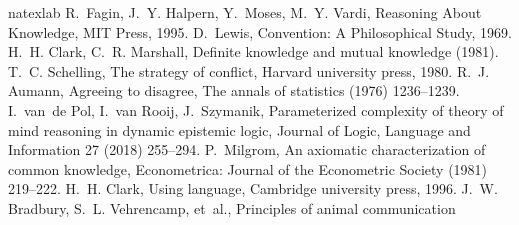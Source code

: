 \if{} 
\begin{thebibliography}{71}
\expandafter\ifx\csname natexlab\endcsname\relax\def\natexlab#1{#1}\fi
\providecommand{\bibinfo}[2]{#2}
\ifx\xfnm\relax \def\xfnm[#1]{\unskip,\space#1}\fi
\bibinfo{author}{R.~Fagin}, \bibinfo{author}{J.~Y. Halpern},
  \bibinfo{author}{Y.~Moses}, \bibinfo{author}{M.~Y. Vardi},
  \bibinfo{title}{Reasoning About Knowledge}, \bibinfo{publisher}{MIT Press},
  \bibinfo{year}{1995}.
\bibinfo{author}{D.~Lewis}, \bibinfo{title}{Convention: A Philosophical Study},
  \bibinfo{year}{1969}.
\bibinfo{author}{H.~H. Clark}, \bibinfo{author}{C.~R. Marshall},
\newblock \bibinfo{title}{Definite knowledge and mutual knowledge}
  (\bibinfo{year}{1981}).
\bibinfo{author}{T.~C. Schelling}, \bibinfo{title}{The strategy of conflict},
  \bibinfo{publisher}{Harvard university press}, \bibinfo{year}{1980}.
\bibinfo{author}{R.~J. Aumann},
\newblock \bibinfo{title}{Agreeing to disagree},
\newblock \bibinfo{journal}{The annals of statistics}  (\bibinfo{year}{1976})
  \bibinfo{pages}{1236--1239}.
\bibinfo{author}{I.~van~de Pol}, \bibinfo{author}{I.~van Rooij},
  \bibinfo{author}{J.~Szymanik},
\newblock \bibinfo{title}{Parameterized complexity of theory of mind reasoning
  in dynamic epistemic logic},
\newblock \bibinfo{journal}{Journal of Logic, Language and Information}
  \bibinfo{volume}{27} (\bibinfo{year}{2018}) \bibinfo{pages}{255--294}.
\bibinfo{author}{P.~Milgrom},
\newblock \bibinfo{title}{An axiomatic characterization of common knowledge},
\newblock \bibinfo{journal}{Econometrica: Journal of the Econometric Society}
  (\bibinfo{year}{1981}) \bibinfo{pages}{219--222}.
\bibinfo{author}{H.~H. Clark}, \bibinfo{title}{Using language},
  \bibinfo{publisher}{Cambridge university press}, \bibinfo{year}{1996}.
\bibinfo{author}{J.~W. Bradbury}, \bibinfo{author}{S.~L. Vehrencamp}, et~al.,
\newblock \bibinfo{title}{Principles of animal communication}

\end{thebibliography}
